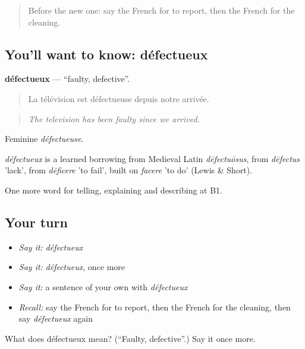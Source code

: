 \label{lesson:FR-C432-defectueux}



\begin{quote}
Before the new one: say the French for to report, then the French for the cleaning.
\end{quote}

\subsection*{You'll want to know: défectueux}
\textbf{défectueux} — \textquotedblleft{}faulty, defective\textquotedblright{}.

\begin{quote}
La télévision est défectueuse depuis notre arrivée.
\end{quote}

\begin{quote}
\emph{The television has been faulty since we arrived.}
\end{quote}

Feminine \emph{défectueuse}.

\begin{cousinweb}
\emph{défectueux} is a learned borrowing from Medieval Latin \emph{dēfectuōsus}, from \emph{dēfectus} 'lack', from \emph{dēficere} 'to fail', built on \emph{facere} 'to do' (Lewis \& Short).
\end{cousinweb}

\begin{grammarlens}[title={What you've built}]
One more word for telling, explaining and describing at B1.
\end{grammarlens}

\subsection*{Your turn}
\begin{itemize}
\raggedright
  \item \emph{Say it:} \emph{défectueux}
  \item \emph{Say it:} \emph{défectueux}, once more
  \item \emph{Say it:} a sentence of your own with \emph{défectueux}
  \item \emph{Recall:} say the French for to report, then the French for the cleaning, then say \emph{défectueux} again
\end{itemize}

\begin{tcolorbox}[breakable,colback=teal!4,colframe=teal!35!black,title={Before you move on}]
What does défectueux mean? (\textquotedblleft{}Faulty, defective\textquotedblright{}.) Say it once more.
\end{tcolorbox}
